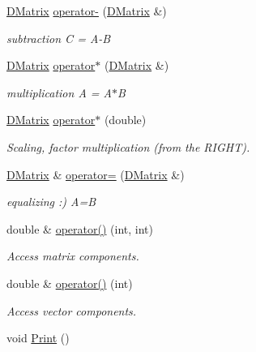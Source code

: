 \begin{DoxyCompactItemize}
\hyperlink{class_d_matrix}{DMatrix} \hyperlink{class_d_matrix_af497924ed5376d2fb34e68489c87a736}{operator-\/} (\hyperlink{class_d_matrix}{DMatrix} \&)
\begin{DoxyCompactList}\small\item\em subtraction C = A-\/B \item\end{DoxyCompactList}\item 
\hyperlink{class_d_matrix}{DMatrix} \hyperlink{class_d_matrix_a8d2eb6c1c37c0b533cc0a9b21ce7ab5f}{operator$\ast$} (\hyperlink{class_d_matrix}{DMatrix} \&)
\begin{DoxyCompactList}\small\item\em multiplication A = A$\ast$B \item\end{DoxyCompactList}\item 
\hyperlink{class_d_matrix}{DMatrix} \hyperlink{class_d_matrix_a87f798d3de8150f7478a26b7f4147043}{operator$\ast$} (double)
\begin{DoxyCompactList}\small\item\em Scaling, factor multiplication (from the RIGHT). \item\end{DoxyCompactList}\item 
\hyperlink{class_d_matrix}{DMatrix} \& \hyperlink{class_d_matrix_a859b08bd3afa3ca1df8fd52cc4fedd6d}{operator=} (\hyperlink{class_d_matrix}{DMatrix} \&)
\begin{DoxyCompactList}\small\item\em equalizing :) A=B \item\end{DoxyCompactList}\item 
double \& \hyperlink{class_d_matrix_ae8a380fd2229f2e6c2cfc238288ba868}{operator()} (int, int)
\begin{DoxyCompactList}\small\item\em Access matrix components. \item\end{DoxyCompactList}\item 
double \& \hyperlink{class_d_matrix_ac1f256d07f2fc00a73270ead2cc4624f}{operator()} (int)
\begin{DoxyCompactList}\small\item\em Access vector components. \item\end{DoxyCompactList}\item 
void \hyperlink{class_d_matrix_a493ae196473346ae6fe2780a9f8b1d39}{Print} ()

\end{DoxyCompactItemize}
